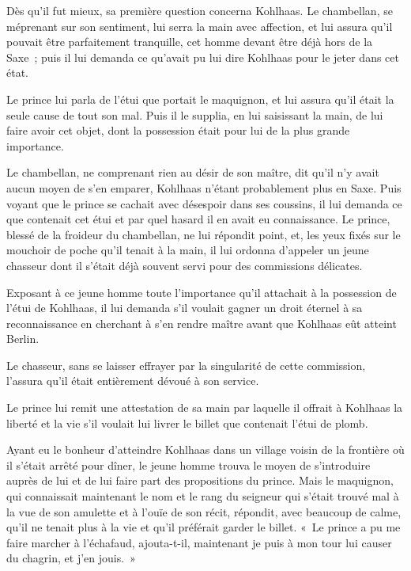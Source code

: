 \documentclass[french,twoside]{book} %
\begin{document}
Dès qu’il fut mieux, sa première question concerna Kohlhaas. Le chambellan, se méprenant sur son sentiment, lui serra la main avec affection, et lui assura qu’il pouvait être parfaitement tranquille, cet homme devant être déjà hors de la Saxe ; puis il lui demanda ce qu’avait pu lui dire Kohlhaas pour le jeter dans cet état.\par
Le prince lui parla de l’étui que portait le maquignon, et lui assura qu’il était la seule cause de tout son mal. Puis il le supplia, en lui saisissant la main, de lui faire avoir cet objet, dont la possession était pour lui de la plus grande importance.\par
Le chambellan, ne comprenant rien au désir de son maître, dit qu’il n’y avait aucun moyen de s’en emparer, Kohlhaas n’étant probablement plus en Saxe. Puis voyant que le prince se cachait avec désespoir dans ses coussins, il lui demanda ce que contenait cet étui et par quel hasard il en avait eu connaissance. Le prince, blessé de la froideur du chambellan, ne lui répondit point, et, les yeux fixés sur le mouchoir de poche qu’il tenait à la main, il lui ordonna d’appeler un jeune chasseur dont il s’était déjà souvent servi pour des commissions délicates.\par
Exposant à ce jeune homme toute l’importance qu’il attachait à la possession de l’étui de Kohlhaas, il lui demanda s’il voulait gagner un droit éternel à sa reconnaissance en cherchant à s’en rendre maître avant que Kohlhaas eût atteint Berlin.\par
Le chasseur, sans se laisser effrayer par la singularité de cette commission, l’assura qu’il était entièrement dévoué à son service.\par
Le prince lui remit une attestation de sa main par laquelle il offrait à Kohlhaas la liberté et la vie s’il voulait lui livrer le billet que contenait l’étui de plomb.\par
Ayant eu le bonheur d’atteindre Kohlhaas dans un village voisin de la frontière où il s’était arrêté pour dîner, le jeune homme trouva le moyen de s’introduire auprès de lui et de lui faire part des propositions du prince. Mais le maquignon, qui connaissait maintenant le nom et le rang du seigneur qui s’était trouvé mal à la vue de son amulette et à l’ouïe de son récit, répondit, avec beaucoup de calme, qu’il ne tenait plus à la vie et qu’il préférait garder le billet. « Le prince a pu me faire marcher à l’échafaud, ajouta\emph{}-t-il, maintenant je puis à mon tour lui causer du chagrin, et j’en jouis. »\par
\end{document}
